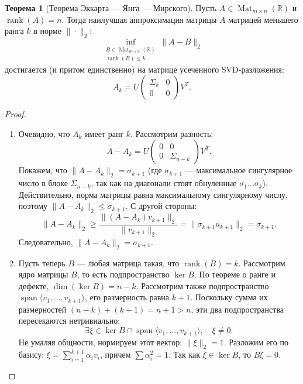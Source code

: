 \documentclass[12pt, a4paper]{article}
\theoremstyle{definition}
\newtheorem{theorem}{Теорема}
\begin{document}
\begin{theorem}[Теорема Эккарта --- Янга --- Мирского]
Пусть $A \in \operatorname{Mat}_{m \times n}(\mathbb{R})$ и $\operatorname{rank}(A) = n$. Тогда наилучшая аппроксимация матрицы $A$ матрицей меньшего ранга $k$ в норме $\|\cdot\|_2$:
\[
\inf_{\substack{B \in \operatorname{Mat}_{m \times n}(\mathbb{R}) \\ \operatorname{rank}(B) \le k}} \|A - B\|_2
\]
достигается (и притом единственно) на матрице усеченного SVD-разложения:
\[
A_k = U \begin{pmatrix} \Sigma_k & 0 \\ 0 & 0 \end{pmatrix} V^T.
\]
\end{theorem}
\begin{proof}\mbox{}
\begin{enumerate}
    \item Очевидно, что $A_k$ имеет ранг $k$. Рассмотрим разность:
    \[
    A - A_k = U \begin{pmatrix} 0 & 0 \\ 0 & \Sigma_{n-k} \end{pmatrix} V^T.
    \]
    Покажем, что $\|A - A_k\|_2 = \sigma_{k+1}$ (где $\sigma_{k+1}$ --- максимальное сингулярное число в блоке $\Sigma_{n-k}$, так как на диагонали стоят обнуленные $\sigma_1 \dots \sigma_k$). \\
    Действительно, норма матрицы равна максимальному сингулярному числу, поэтому $\|A - A_k\|_2 \le \sigma_{k+1}$. С другой стороны:
    \[
    \|A - A_k\|_2 \ge \frac{\|(A - A_k)v_{k+1}\|_2}{\|v_{k+1}\|_2} = \|\sigma_{k+1}u_{k+1}\|_2 = \sigma_{k+1}.
    \]
    Следовательно, $\|A - A_k\|_2 = \sigma_{k+1}$.

    \item Пусть теперь $B$ --- любая матрица такая, что $\operatorname{rank}(B) = k$. 
    Рассмотрим ядро матрицы $B$, то есть подпространство $\ker B$. По теореме о ранге и дефекте, $\dim(\ker B) = n - k$. 
    Рассмотрим также подпространство $\operatorname{span}\langle v_1, \dots, v_{k+1} \rangle$, его размерность равна $k+1$.
    Поскольку сумма их размерностей $(n - k) + (k + 1) = n + 1 > n$, эти два подпространства пересекаются нетривиально:
    \[
    \exists \xi \in \ker B \cap \operatorname{span}\langle v_1, \dots, v_{k+1} \rangle, \quad \xi \neq 0.
    \]
    Не умаляя общности, нормируем этот вектор: $\|\xi\|_2 = 1$. Разложим его по базису:
    $\xi = \sum_{i=1}^{k+1} \alpha_i v_i$, причем $\sum \alpha_i^2 = 1$. Так как $\xi \in \ker B$, то $B\xi = 0$.
    

\end{enumerate}
\end{proof}
\end{document}

